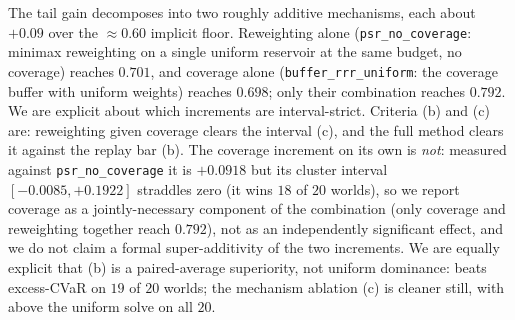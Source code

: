 The tail gain decomposes into two roughly additive mechanisms, each about
$+0.09$ over the $\approx0.60$ implicit floor. Reweighting alone
(\texttt{psr\_no\_coverage}: minimax reweighting on a single uniform reservoir at
the same budget, no coverage) reaches $0.701$, and coverage alone
(\texttt{buffer\_rrr\_uniform}: the coverage buffer with uniform weights) reaches
$0.698$; only their combination reaches $0.792$. We are explicit about which increments are
interval-strict. Criteria (b) and (c) are: reweighting given coverage clears the
interval (c), and the full method clears it against the replay bar (b). The
coverage increment on its own is \emph{not}: measured against
\texttt{psr\_no\_coverage} it is $+0.0918$ but its cluster interval
$[-0.0085,+0.1922]$ straddles zero (it wins $18$ of $20$ worlds), so we report
coverage as a jointly-necessary component of the combination (only coverage and
reweighting together reach $0.792$), not as an independently significant effect,
and we do not claim a formal super-additivity of the two increments. We are equally explicit that (b) is a paired-average
superiority, not uniform dominance: \method{} beats excess-CVaR on $19$ of $20$
worlds; the mechanism ablation (c) is cleaner still, with \method{} above the
uniform solve on all $20$.

